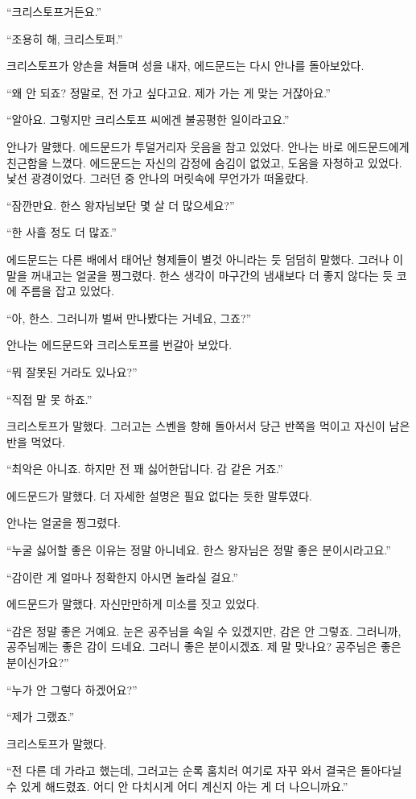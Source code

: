 ``크리스토프거든요.''

``조용히 해, 크리스토퍼.''

크리스토프가 양손을 쳐들며 성을 내자, 에드문드는 다시 안나를 돌아보았다.

``왜 안 되죠? 정말로, 전 가고 싶다고요. 제가 가는 게 맞는 거잖아요.''

``알아요. 그렇지만 크리스토프 씨에겐 불공평한 일이라고요.''

안나가 말했다. 에드문드가 투덜거리자 웃음을 참고 있었다. 안나는 바로 에드문드에게 친근함을 느꼈다. 에드문드는 자신의 감정에 숨김이 없었고, 도움을 자청하고 있었다. 낯선 광경이었다. 그러던 중 안나의 머릿속에 무언가가 떠올랐다.

``잠깐만요. 한스 왕자님보단 몇 살 더 많으세요?''

``한 사흘 정도 더 많죠.''

에드문드는 다른 배에서 태어난 형제들이 별것 아니라는 듯 덤덤히 말했다. 그러나 이 말을 꺼내고는 얼굴을 찡그렸다. 한스 생각이 마구간의 냄새보다 더 좋지 않다는 듯 코에 주름을 잡고 있었다.

``아, 한스. 그러니까 벌써 만나봤다는 거네요, 그죠?''

안나는 에드문드와 크리스토프를 번갈아 보았다.

``뭐 잘못된 거라도 있나요?''

``직접 말 못 하죠.''

크리스토프가 말했다. 그러고는 스벤을 향해 돌아서서 당근 반쪽을 먹이고 자신이 남은 반을 먹었다.

``최악은 아니죠. 하지만 전 꽤 싫어한답니다. 감 같은 거죠.''

에드문드가 말했다. 더 자세한 설명은 필요 없다는 듯한 말투였다.

안나는 얼굴을 찡그렸다.

``누굴 싫어할 좋은 이유는 정말 아니네요. 한스 왕자님은 정말 좋은 분이시라고요.''

``감이란 게 얼마나 정확한지 아시면 놀라실 걸요.''

에드문드가 말했다. 자신만만하게 미소를 짓고 있었다.

``감은 정말 좋은 거예요. 눈은 공주님을 속일 수 있겠지만, 감은 안 그렇죠. 그러니까, 공주님께는 좋은 감이 드네요. 그러니 좋은 분이시겠죠. 제 말 맞나요? 공주님은 좋은 분이신가요?''

``누가 안 그렇다 하겠어요?''

``제가 그랬죠.''

크리스토프가 말했다.

``전 다른 데 가라고 했는데, 그러고는 순록 훔치러 여기로 자꾸 와서 결국은 돌아다닐 수 있게 해드렸죠. 어디 안 다치시게 어디 계신지 아는 게 더 나으니까요.''

